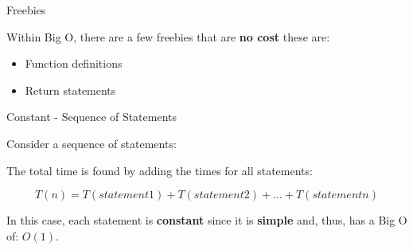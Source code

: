 \begin{frame}[fragile]{Freebies}

Within Big O, there are a few freebies that are \textbf{no cost} these
are:

\begin{itemize}
\tightlist
\item
  Function definitions
\end{itemize}

\begin{Shaded}
\begin{Highlighting}[]
\StringTok{ }
\end{Highlighting}
\end{Shaded}

\begin{itemize}
\tightlist
\item
  Return statements
\end{itemize}

\begin{Shaded}
\begin{Highlighting}[]
\end{Highlighting}
\end{Shaded}

\end{frame}

\begin{frame}[fragile]{Constant - Sequence of Statements}

Consider a sequence of statements:

\begin{Shaded}
\begin{Highlighting}[]
\end{Highlighting}
\end{Shaded}

The total time is found by adding the times for all statements:

\[T(n) = T(statement 1) + T(statement 2) + ... + T(statement n)\]

In this case, each statement is \textbf{constant} since it is
\textbf{simple} and, thus, has a Big O of: \(O(1)\).

\end{frame}

